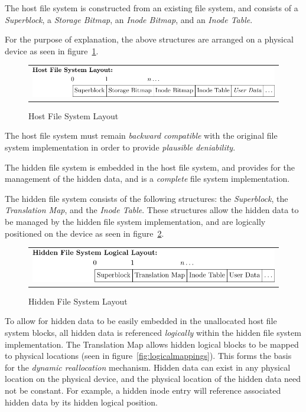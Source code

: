 \documentclass[portrait, a0]{a0poster}
\def\SSHeading#1{\medskip\par\noindent{\large\color{DarkBlue} #1}\medskip}
\begin{document}
\begin{textblock}{8}
The host file system is constructed from an existing file system, and consists of a \emph{Superblock}, a \emph{Storage Bitmap}, an \emph{Inode Bitmap}, and an \emph{Inode Table}.

For the purpose of explanation, the above structures are arranged on a physical device as seen in figure~\ref{fig:hostlayout}.

\begin{figure}
\centering
\begin{tabular}{c}
\\
\includegraphics[scale=1.3]{pics/fig-1.pdf}
\end{tabular}
\caption{Host File System Layout \label{fig:hostlayout}}
\end{figure}

The host file system must remain \emph{backward compatible} with the original file system implementation in order to provide \emph{plausible deniability}.

\SSHeading{Hidden File System}

The hidden file system is embedded in the host file system, and provides for the management of the hidden data, and is a \emph{complete} file system implementation.

The hidden file system consists of the following structures: the \emph{Superblock}, the \emph{Translation Map}, and the \emph{Inode Table}. These structures allow the hidden data to be managed by the hidden file system implementation, and are logically positioned on the device as seen in figure~\ref{fig:hiddenlayout}.

\begin{figure}
\centering
\begin{tabular}{c}
\\
\includegraphics[scale=1.3]{pics/fig-3.pdf}
\end{tabular}
\caption{Hidden File System Layout \label{fig:hiddenlayout}}
\end{figure}

To allow for hidden data to be easily embedded in the unallocated host file system blocks, all hidden data is referenced \emph{logically} within the hidden file system implementation. The Translation Map allows hidden logical blocks to be mapped to physical locations (seen in figure~\ref{fig:logicalmappings}). This forms the basis for the \emph{dynamic reallocation} mechanism. Hidden data can exist in any physical location on the physical device, and the physical location of the hidden data need not be constant. For example, a hidden inode entry will reference associated hidden data by its hidden logical position.

\end{textblock}
\end{document}
